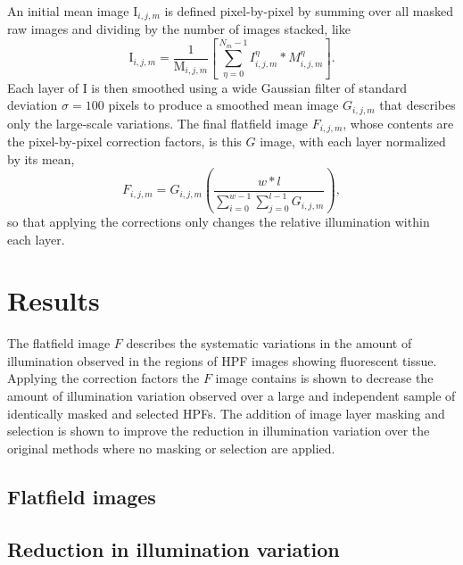 \documentclass[letterpaper,11pt]{article}
\newcommand{\Iota}{\mathrm{I}}
\newcommand{\Mu}{\mathrm{M}}
\begin{document}
An initial mean image $\Iota_{i,j,m}$ is defined pixel-by-pixel by summing over all masked raw images and dividing by the number of images stacked, like
\begin{equation}
\Iota_{i,j,m} = \frac{1}{\Mu_{i,j,m}} \left[ \sum_{\eta=0}^{N_{m}-1} I^{\eta}_{i,j,m}*M^{\eta}_{i,j,m} \right] .
\end{equation}
Each layer of $\Iota$ is then smoothed using a wide Gaussian filter of standard deviation $\sigma=100$ pixels to produce a smoothed mean image $G_{i,j,m}$ that describes only the large-scale variations. The final flatfield image $F_{i,j,m}$, whose contents are the pixel-by-pixel correction factors, is this $G$ image, with each layer normalized by its mean,
\begin{equation}
F_{i,j,m} = G_{i,j,m} \left( \frac{w*l}{\sum_{i=0}^{w-1}\sum_{j=0}^{l-1}G_{i,j,m}} \right) ,
\end{equation}
so that applying the corrections only changes the relative illumination within each layer. 

\clearpage

\section{Results}
\label{sec:results}

The flatfield image $F$ describes the systematic variations in the amount of illumination observed in the regions of HPF images showing fluorescent tissue. Applying the correction factors the $F$ image contains is shown to decrease the amount of illumination variation observed over a large and independent sample of identically masked and selected HPFs. The addition of image layer masking and selection is shown to improve the reduction in illumination variation over the original methods where no masking or selection are applied.

\subsection{Flatfield images}
\label{ssec:flatfield_images}

\subsection{Reduction in illumination variation}
\label{ssec:reduction_in_illumination_variation}
\end{document}
